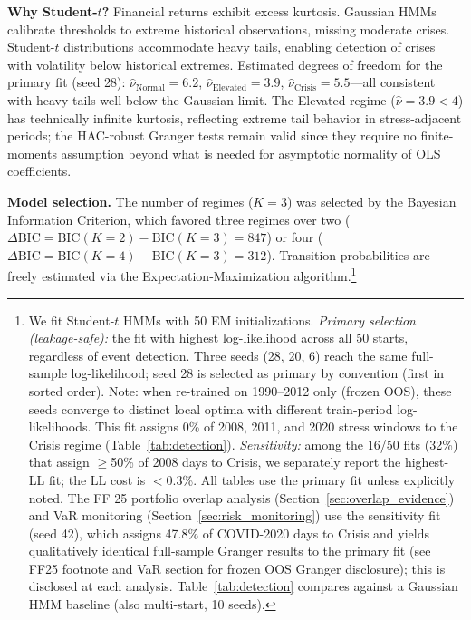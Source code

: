 \documentclass[sigconf,anonymous]{acmart}
\begin{document}
\textbf{Why Student-$t$?} Financial returns exhibit excess kurtosis. Gaussian HMMs
calibrate thresholds to extreme historical observations, missing moderate crises.
Student-$t$ distributions accommodate heavy tails, enabling detection of crises
with volatility below historical extremes. Estimated degrees of freedom for the
primary fit (seed 28): $\hat{\nu}_{\text{Normal}} = 6.2$, $\hat{\nu}_{\text{Elevated}} = 3.9$,
$\hat{\nu}_{\text{Crisis}} = 5.5$---all consistent with heavy tails well below
the Gaussian limit. The Elevated regime ($\hat\nu = 3.9 < 4$) has technically
infinite kurtosis, reflecting extreme tail behavior in stress-adjacent periods;
the HAC-robust Granger tests remain valid since they require no finite-moments
assumption beyond what is needed for asymptotic normality of OLS coefficients.

\textbf{Model selection.} The number of regimes ($K=3$) was selected by the Bayesian
Information Criterion, which favored three regimes over two
($\Delta\text{BIC} = \text{BIC}(K{=}2) - \text{BIC}(K{=}3) = 847$) or
four ($\Delta\text{BIC} = \text{BIC}(K{=}4) - \text{BIC}(K{=}3) = 312$). Transition probabilities are freely estimated via the Expectation-Maximization algorithm.\footnote{We fit Student-$t$ HMMs with 50
EM initializations.
\emph{Primary selection (leakage-safe):} the fit with highest log-likelihood across
all 50 starts, regardless of event detection. Three seeds (28, 20, 6) reach the same
full-sample log-likelihood; seed 28 is selected as primary by convention
(first in sorted order). Note: when re-trained on 1990--2012 only (frozen OOS),
these seeds converge to distinct local optima with different train-period log-likelihoods.
This fit assigns 0\% of 2008, 2011, and
2020 stress windows to the Crisis regime (Table~\ref{tab:detection}).
\emph{Sensitivity:} among the 16/50 fits (32\%) that assign $\geq$50\% of 2008
days to Crisis, we separately report the highest-LL fit; the LL cost is $<$0.3\%.
All tables use the primary fit unless explicitly noted.
The FF 25 portfolio overlap analysis (Section~\ref{sec:overlap_evidence}) and VaR
monitoring (Section~\ref{sec:risk_monitoring}) use the sensitivity fit (seed 42),
which assigns 47.8\% of COVID-2020 days to Crisis and yields qualitatively identical
full-sample Granger results to the primary fit (see FF25 footnote and VaR section
for frozen OOS Granger disclosure); this is disclosed at each analysis.
Table~\ref{tab:detection} compares against a Gaussian HMM baseline
(also multi-start, 10 seeds).}
\end{document}
